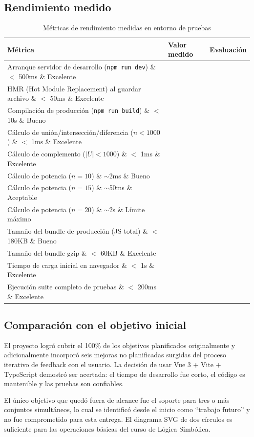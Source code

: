 \documentclass[11pt,a4paper]{article}
\begin{document}
\subsection{Rendimiento medido}
\begin{table}[htbp]
\centering
\caption{Métricas de rendimiento medidas en entorno de pruebas}
\begin{tabularx}{\textwidth}{lXX}
\toprule
\textbf{Métrica} & \textbf{Valor medido} & \textbf{Evaluación} \\
\midrule
Arranque servidor de desarrollo (\texttt{npm run dev}) \& $<$ 500ms \& Excelente \\
HMR (Hot Module Replacement) al guardar archivo \& $<$ 50ms \& Excelente \\
Compilación de producción (\texttt{npm run build}) \& $<$ 10s \& Bueno \\
Cálculo de unión/intersección/diferencia ($n < 1000$) \& $<$ 1ms \& Excelente \\
Cálculo de complemento ($|U| < 1000$) \& $<$ 1ms \& Excelente \\
Cálculo de potencia ($n=10$) \& $\sim$2ms \& Bueno \\
Cálculo de potencia ($n=15$) \& $\sim$50ms \& Aceptable \\
Cálculo de potencia ($n=20$) \& $\sim$2s \& Límite máximo \\
Tamaño del bundle de producción (JS total) \& $<$ 180KB \& Bueno \\
Tamaño del bundle gzip \& $<$ 60KB \& Excelente \\
Tiempo de carga inicial en navegador \& $<$ 1s \& Excelente \\
Ejecución suite completo de pruebas \& $<$ 200ms \& Excelente \\
\bottomrule
\end{tabularx}
\end{table}

\subsection{Comparación con el objetivo inicial}
El proyecto logró cubrir el 100\% de los objetivos planificados originalmente y adicionalmente incorporó seis mejoras no planificadas surgidas del proceso iterativo de feedback con el usuario. La decisión de usar Vue 3 + Vite + TypeScript demostró ser acertada: el tiempo de desarrollo fue corto, el código es mantenible y las pruebas son confiables.

El único objetivo que quedó fuera de alcance fue el soporte para tres o más conjuntos simultáneos, lo cual se identificó desde el inicio como ``trabajo futuro'' y no fue comprometido para esta entrega. El diagrama SVG de dos círculos es suficiente para las operaciones básicas del curso de Lógica Simbólica.
\end{document}
